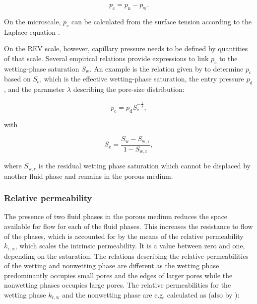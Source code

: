 \begin{equation}\label{eq:pc-pn_pw}
p_\mathrm{c} = p_\mathrm{n} - p_\mathrm{w}.
\end{equation}

On the microscale, $p_\mathrm{c}$ can be calculated from the surface tension 
according to the Laplace equation \citep[see][]{helmig1997multiphase}.

On the REV scale, however, capillary pressure needs to be defined by quantities of that scale. 
Several empirical relations provide expressions to link $p_\mathrm{c}$ to the wetting-phase saturation $S_\mathrm{w}$. 
An example is the relation given by \citet{brooks1964hydrau} %
to determine $p_\mathrm{c}$ based on 
$S_\mathrm{e}$, which is the effective wetting-phase saturation,
the entry pressure $p_\mathrm{d}$, and the parameter $\lambda$ describing the pore-size distribution:

\begin{equation}\label{eq:pc-Sw}
p_\mathrm{c} = p_\mathrm{d} S_\mathrm{e}^{-\frac{1}{\lambda}},
\end{equation}

with 

\begin{equation}\label{eq:Se}
S_\mathrm{e} = \frac{S_\mathrm{w}-S_\mathrm{w,r}}{1-S_\mathrm{w,r}},
\end{equation}

where $S_\mathrm{w,r}$ is the residual wetting phase saturation which cannot be displaced
by another fluid phase and remains in the porous medium.

\subsubsection{Relative permeability}\label{sec:kr}
The presence of two fluid phases in the porous medium reduces the space available for flow 
for each of the fluid phases. 
This increases the resistance to flow of the phases, which is accounted for by the means of 
the relative permeability $k_\mathrm{r,\alpha}$, which scales the intrinsic permeability. 
It is a value between zero and one, depending on the saturation. 
The relations describing the relative permeabilities of the wetting and nonwetting phase are different 
as the wetting phase predominantly occupies small pores and the edges of larger pores while the 
nonwetting phases occupies large pores.
The relative permeabilities for the wetting phase $k_\mathrm{r,w}$ and the nonwetting phase are e.g. calculated as (also by \citet{brooks1964hydrau}):


